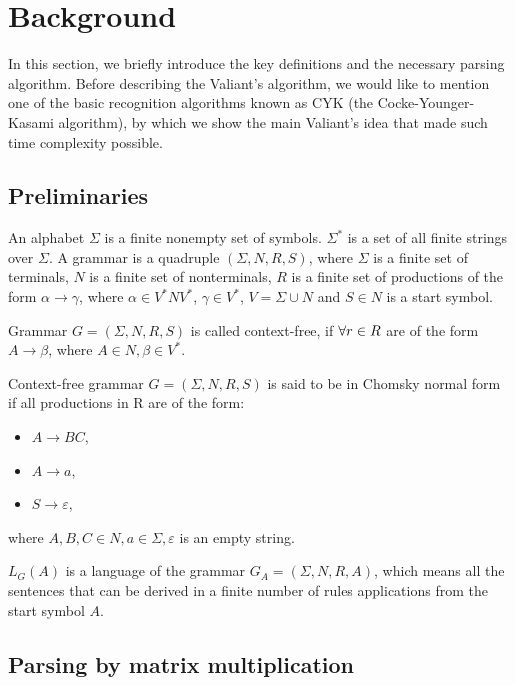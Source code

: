 \section{Background}

In this section, we briefly introduce the key definitions and the necessary parsing algorithm.
Before describing the Valiant's  algorithm, we would like to mention one of the basic recognition algorithms known as CYK (the Cocke-Younger-Kasami algorithm), by which we show the main Valiant's idea that made such time complexity possible.

\subsection{Preliminaries}

An alphabet $\Sigma$ is a finite nonempty set of symbols. $\Sigma^{*}$ is a set of all finite strings over $\Sigma$.
A grammar is a quadruple $(\Sigma, N, R, S)$, where $\Sigma$ is a finite set of terminals, $N$ is a finite set of nonterminals, $R$ is a finite set of productions of the form $\alpha \rightarrow \gamma$, where $\alpha \in V^{*}NV^{*}$, $\gamma \in V^{*}$, $V = \Sigma \cup N$ and $S \in N$ is a start symbol.

\begin{defn} Grammar $G = (\Sigma, N, R, S)$ is called context-free, if $\space\forall r \in R$ are of the form $A \rightarrow \beta$, where $A \in N, \beta \in V^{*}$.
\end{defn}

\begin{defn} Context-free grammar $G = (\Sigma, N, R, S)$ is said to be in Chomsky normal form if all productions in R are of the form:
\begin{itemize}
  \item $A \rightarrow BC$,
  \item $A \rightarrow a$,
  \item $S \rightarrow \varepsilon$,
\end{itemize}
where $A, B, C \in N, a \in \Sigma, \varepsilon$ is an empty string.
\end{defn}

\begin{defn} $L_{G}(A)$ is a language of the grammar $G_{A} = (\Sigma, N, R, A)$, which means all the sentences that can be derived in a finite number of rules applications from the start symbol $A$.
\end{defn}


\subsection{Parsing by matrix multiplication}

